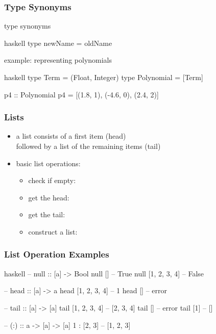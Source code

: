 \documentclass[dvipsnames]{beamer}
\theoremstyle{plain}
\begin{document}
\begin{frame}[fragile]
  \frametitle{Type Synonyms}

  \begin{block}{type synonyms}
    \begin{pygments}{haskell}
type newName = oldName
    \end{pygments}
  \end{block}

  \begin{exampleblock}{example: representing polynomials}
    \begin{pygments}{haskell}
type Term = (Float, Integer)
type Polynomial = [Term]

p4 :: Polynomial
p4 = [(1.8, 1), (-4.6, 0), (2.4, 2)]
    \end{pygments}
  \end{exampleblock}
\end{frame}

\begin{frame}
  \frametitle{Lists}

  \begin{itemize}
    \item a list consists of a first item (\alert{head})\\
      followed by a list of the remaining items (\alert{tail})

  \medskip
    \item basic list operations:
      \begin{itemize}
        \item check if empty: 
        \item get the head: 
        \item get the tail: 
        \item construct a list: 
      \end{itemize}
  \end{itemize}
\end{frame}

\begin{frame}[fragile]
  \frametitle{List Operation Examples}

  \begin{exampleblock}{}
    \begin{pygments}{haskell}
-- null :: [a] -> Bool
null []            -- True
null [1, 2, 3, 4]  -- False

-- head :: [a] -> a
head [1, 2, 3, 4]  -- 1
head []            -- error

-- tail :: [a] -> [a]
tail [1, 2, 3, 4]  -- [2, 3, 4]
tail []            -- error
tail [1]           -- []

-- (:) :: a -> [a] -> [a]
1 : [2, 3]         -- [1, 2, 3]
    \end{pygments}
  \end{exampleblock}
\end{frame}
\end{document}
